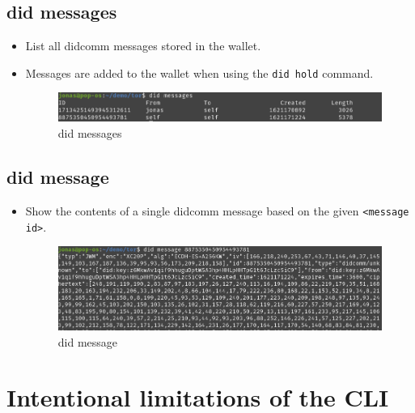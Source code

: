 \hypertarget{did-messages}{%
\subsection{did messages}\label{did-messages}}

\begin{itemize}
\item
  List all didcomm messages stored in the wallet.
\item
  Messages are added to the wallet when using the
  \lstinline!did hold! command.

  \begin{figure}
  \centering
  \includegraphics[width=\textwidth]{User Interface f8759a9462b24d5f95cf6123d68b89ea/Untitled 15.png}
  \caption{did messages}
  \end{figure}
\end{itemize}

\hypertarget{did-message}{%
\subsection{\texorpdfstring{did message
}{did message }}\label{did-message}}

\begin{itemize}
\item
  Show the contents of a single didcomm message based on the given
  \lstinline!<message id>!.

  \begin{figure}
  \centering
  \includegraphics[width=\textwidth]{User Interface f8759a9462b24d5f95cf6123d68b89ea/Untitled 16.png}
  \caption{did message}
  \end{figure}
\end{itemize}

\hypertarget{intentional-limitations-of-the-cli}{%
\section{Intentional limitations of the
CLI}\label{intentional-limitations-of-the-cli}}

